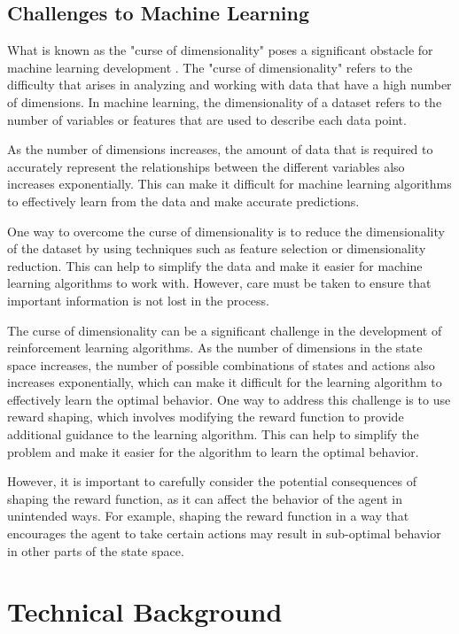 \documentclass[10pt,twocolumn]{article}
\begin{document}
\subsection{Challenges to Machine Learning}
What is known as the "curse of dimensionality" poses a significant obstacle for machine learning development \cite{karanam_2021}. The "curse of dimensionality" refers to the difficulty that arises in analyzing and working with data that have a high number of dimensions. In machine learning, the dimensionality of a dataset refers to the number of variables or features that are used to describe each data point.

As the number of dimensions increases, the amount of data that is required to accurately represent the relationships between the different variables also increases exponentially. This can make it difficult for machine learning algorithms to effectively learn from the data and make accurate predictions.

One way to overcome the curse of dimensionality is to reduce the dimensionality of the dataset by using techniques such as feature selection or dimensionality reduction. This can help to simplify the data and make it easier for machine learning algorithms to work with. However, care must be taken to ensure that important information is not lost in the process.

The curse of dimensionality can be a significant challenge in the development of reinforcement learning algorithms. As the number of dimensions in the state space increases, the number of possible combinations of states and actions also increases exponentially, which can make it difficult for the learning algorithm to effectively learn the optimal behavior. One way to address this challenge is to use reward shaping, which involves modifying the reward function to provide additional guidance to the learning algorithm. This can help to simplify the problem and make it easier for the algorithm to learn the optimal behavior.

However, it is important to carefully consider the potential consequences of shaping the reward function, as it can affect the behavior of the agent in unintended ways. For example, shaping the reward function in a way that encourages the agent to take certain actions may result in sub-optimal behavior in other parts of the state space.



\section{Technical Background}
\end{document}
